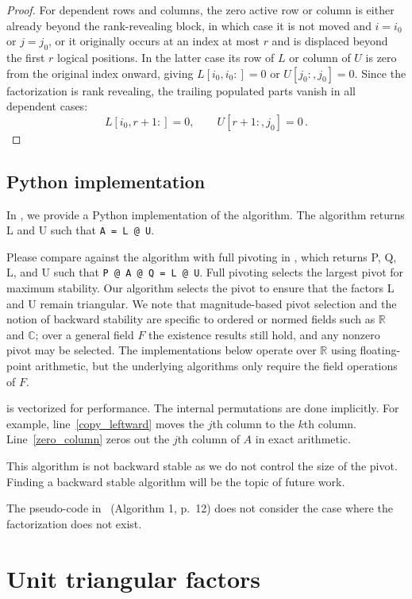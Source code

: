 \documentclass[10pt,twoside]{siamart1116}
\numberwithin{theorem}{section}
\begin{document}
\begin{proof}
  For dependent rows and columns, the zero active row or column is either already beyond the rank-revealing block, in which case it is not moved and $i=i_0$ or $j=j_0$, or it originally occurs at an index at most $r$ and is displaced beyond the first $r$ logical positions. In the latter case its row of $L$ or column of $U$ is zero from the original index onward, giving $L[i_0,i_0:]=0$ or $U[j_0:,j_0]=0$. Since the factorization is rank revealing, the trailing populated parts vanish in all dependent cases:
  \[
    L[i_0,r+1:] = 0, \qquad U[r+1:,j_0] = 0 \,.
  \]
\end{proof}

\subsection{Python implementation}

In , we provide a Python implementation of the algorithm. The algorithm returns L and U such that \verb|A = L @ U|.

Please compare against the algorithm with full pivoting in , which returns P, Q, L, and U such that \verb|P @ A @ Q = L @ U|. Full pivoting selects the largest pivot for maximum stability. Our algorithm selects the pivot to ensure that the factors L and U remain triangular. We note that magnitude-based pivot selection and the notion of backward stability are specific to ordered or normed fields such as $\mathbb{R}$ and $\mathbb{C}$; over a general field $F$ the existence results still hold, and any nonzero pivot may be selected. The implementations below operate over $\mathbb{R}$ using floating-point arithmetic, but the underlying algorithms only require the field operations of $F$.

 is vectorized for performance. The internal permutations are done implicitly. For example, line~\ref{copy_leftward} moves the $j$th column to the $k$th column. Line~\ref{zero_column} zeros out the $j$th column of $A$ in exact arithmetic.

This algorithm is not backward stable as we do not control the size of the pivot. Finding a backward stable algorithm will be the topic of future work.

The pseudo-code in~\cite{okunev_necessary_2005} (Algorithm 1, p.~12) does not consider the case where the factorization does not exist.

\section{Unit triangular factors}\label{sec:unit_triangular}
\end{document}

